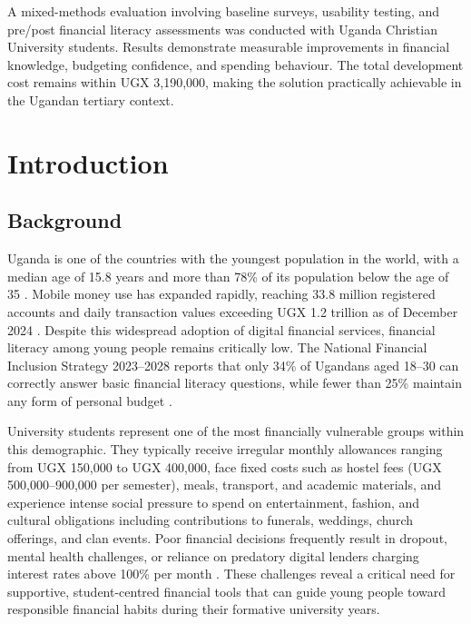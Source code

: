 \documentclass[12pt,a4paper]{report}
\begin{document}
A mixed-methods evaluation involving baseline surveys, usability testing, and
pre/post financial literacy assessments was conducted with Uganda Christian University
students. Results demonstrate measurable improvements in financial knowledge,
budgeting confidence, and spending behaviour. The total development cost remains
within UGX 3,190,000, making the solution practically achievable in the Ugandan
tertiary context.

\tableofcontents
\listoffigures
\listoftables

\chapter{Introduction}

\section{Background}

Uganda is one of the countries with the youngest population in the world, with a median
age of 15.8 years and more than 78\% of its population below the age of 35
\citep{UBOS2024}. Mobile money use has expanded rapidly, reaching 33.8 million
registered accounts and daily transaction values exceeding UGX 1.2 trillion as of
December 2024 \citep{BOU2024}. Despite this widespread adoption of digital financial
services, financial literacy among young people remains critically low. The National
Financial Inclusion Strategy 2023--2028 reports that only 34\% of Ugandans aged
18--30 can correctly answer basic financial literacy questions, while fewer than 25\%
maintain any form of personal budget \citep{MoFPED2023}.

University students represent one of the most financially vulnerable groups within this
demographic. They typically receive irregular monthly allowances ranging from UGX
150,000 to UGX 400,000, face fixed costs such as hostel fees (UGX 500,000--900,000
per semester), meals, transport, and academic materials, and experience intense social
pressure to spend on entertainment, fashion, and cultural obligations including
contributions to funerals, weddings, church offerings, and clan events. Poor financial
decisions frequently result in dropout, mental health challenges, or reliance on
predatory digital lenders charging interest rates above 100\% per month \citep{MoFPED2023}.
These challenges reveal a critical need for supportive, student-centred financial tools
that can guide young people toward responsible financial habits during their formative
university years.
\end{document}

